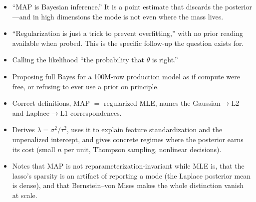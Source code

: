 \begin{interviewq}
\redflags
\begin{itemize}
    \item ``MAP is Bayesian inference.'' It is a point estimate that discards the posterior---and in high dimensions the mode is not even where the mass lives.
    \item ``Regularization is just a trick to prevent overfitting,'' with no prior reading available when probed. This is the specific follow-up the question exists for.
    \item Calling the likelihood ``the probability that $\theta$ is right.''
    \item Proposing full Bayes for a 100M-row production model as if compute were free, or refusing to ever use a prior on principle.
\end{itemize}


\goodgreat
\begin{itemize}
    \item {} Correct definitions, MAP $=$ regularized MLE, names the Gaussian$\to$L2 and Laplace$\to$L1 correspondences.
    \item {} Derives $\lambda = \sigma^2/\tau^2$, uses it to explain feature standardization and the unpenalized intercept, and gives concrete regimes where the posterior earns its cost (small $n$ per unit, Thompson sampling, nonlinear decisions).
    \item {} Notes that MAP is not reparameterization-invariant while MLE is, that the lasso's sparsity is an artifact of reporting a mode (the Laplace posterior mean is dense), and that Bernstein--von Mises makes the whole distinction vanish at scale.
\end{itemize}

\end{interviewq}

